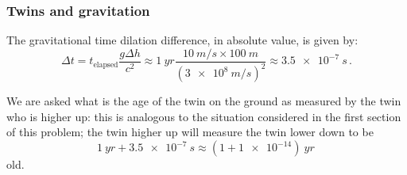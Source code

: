 \documentclass[main.tex]{subfiles}
\begin{document}
\subsubsection{Twins and gravitation}

The gravitational time dilation difference, in absolute value, is given by: 
%
\begin{equation}
  \Delta t = t _{\text{elapsed}} \frac{g \Delta h}{c^2}
  \approx \SI{1}{yr} \frac{\SI{10}{m/s} \times \SI{100}{m}}{(\SI{3e8}{m/s})^2} \approx \SI{3.5e-7}{s} 
\,.
\end{equation}

We are asked what is the age of the twin on the ground as measured by the twin who is higher up: this is analogous to the situation considered in the first section of this problem; the twin higher up will measure the twin lower down to be 
%
\begin{equation}
  \SI{1}{yr} + \SI{3.5e-7}{s} \approx (1+\num{1e-14}) \SI{}{yr} 
\,
\end{equation}
%
old.
\end{document}
